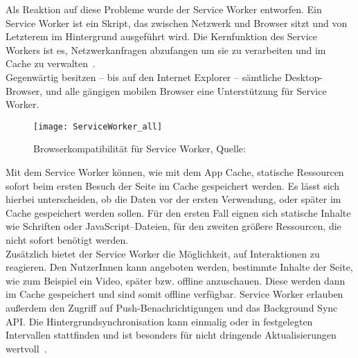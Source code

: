 Als Reaktion auf diese Probleme wurde der Service Worker entworfen.
%
%
Ein Service Worker ist ein Skript, das zwischen Netzwerk und Browser sitzt und von Letzterem im Hintergrund ausgeführt wird. Die Kernfunktion des Service Workers ist es, Netzwerkanfragen abzufangen um sie zu verarbeiten und im Cache zu verwalten~\cite{serviceworker}.\\
Gegenwärtig besitzen -- bis auf den Internet Explorer -- sämtliche Desktop-Browser, und alle gängigen mobilen Browser eine Unterstützung für Service Worker.
%
\begin{figure}[H]
	\centering
	\texttt{[image: ServiceWorker\_all]}
	\grayRule
	\caption[Browserkompatibilität für Service Worker]{Browserkompatibilität für Service Worker, Quelle: ~\cite{caniuse-sw}}
	\label{fig:serviceworker}
\end{figure}
%
Mit dem Service Worker können, wie mit dem App Cache, statische Ressourcen sofort beim ersten Besuch der Seite im Cache gespeichert werden. Es lässt sich hierbei unterscheiden, ob die Daten vor der ersten Verwendung, oder später im Cache gespeichert werden sollen. Für den ersten Fall eignen sich statische Inhalte wie Schriften oder JavaScript--Dateien, für den zweiten größere Ressourcen, die nicht sofort benötigt werden.\\
Zusätzlich bietet der Service Worker die Möglichkeit, auf Interaktionen zu reagieren. Den NutzerInnen kann angeboten werden, bestimmte Inhalte der Seite, wie zum Beispiel ein Video, später bzw. offline anzuschauen. Diese werden dann im Cache gespeichert und sind somit offline verfügbar.
Service Worker erlauben außerdem den Zugriff auf Push-Benachrichtigungen und das Background Sync \gls{API}. Die Hintergrundsynchronisation kann einmalig oder in festgelegten Intervallen stattfinden und ist besonders für nicht dringende Aktualisierungen wertvoll~\cite{offline_cookbook}.